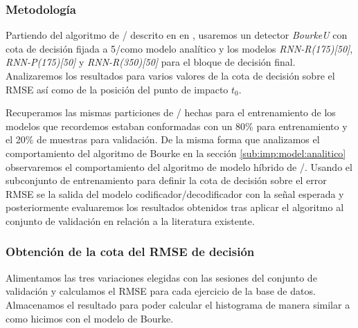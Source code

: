 \subsubsection{Metodología}

Partiendo del algoritmo de \ifell/ descrito en en , usaremos un detector \textit{BourkeU} con cota de decisión fijada a 5\g/como modelo analítico y los modelos \textit{RNN-R(175)[50]}, \textit{RNN-P(175)[50]} y \textit{RNN-R(350)[50]} para el bloque de decisión final. Analizaremos los resultados para varios valores de la cota de decisión sobre el RMSE así como de la posición del punto de impacto $t_0$.

Recuperamos las mismas particiones de \sisfall/ hechas para el entrenamiento de los modelos que recordemos estaban conformadas con un 80\% para entrenamiento y el 20\% de muestras para validación. De la misma forma que analizamos el comportamiento del algoritmo de Bourke en la sección \ref{sub:imp:model:analitico} observaremos el comportamiento del algoritmo de modelo híbrido de \ifell/. Usando el subconjunto de entrenamiento para definir la cota de decisión sobre el error RMSE se la salida del modelo codificador/decodificador con la señal esperada y posteriormente evaluaremos los resultados obtenidos tras aplicar el algoritmo al conjunto de validación en relación a la literatura existente.

\subsubsection{Obtención de la cota del RMSE de decisión}

Alimentamos las tres variaciones elegidas con las sesiones del conjunto de validación y calculamos el RMSE para cada ejercicio de la base de datos. Almacenamos el resultado para poder calcular el histograma de manera similar a como hicimos con el modelo de Bourke.

